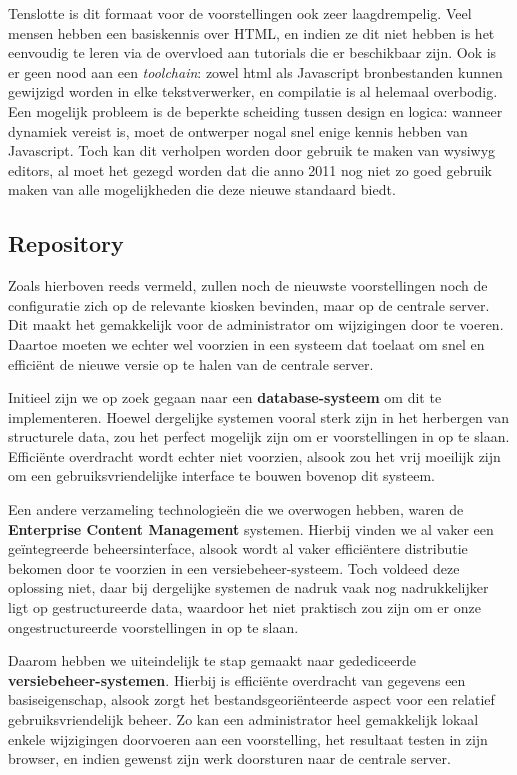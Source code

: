 Tenslotte is dit formaat voor de voorstellingen ook zeer laagdrempelig. Veel mensen hebben een basiskennis over HTML, en indien ze dit niet hebben is het eenvoudig te leren via de overvloed aan tutorials die er beschikbaar zijn. Ook is er geen nood aan een \emph{toolchain}: zowel \ac{html} als Javascript bronbestanden kunnen gewijzigd worden in elke tekstverwerker, en compilatie is al helemaal overbodig.
Een mogelijk probleem is de beperkte scheiding tussen design en logica: wanneer dynamiek vereist is, moet de ontwerper nogal snel enige kennis hebben van Javascript. Toch kan dit verholpen worden door gebruik te maken van \ac{wysiwyg} editors, al moet het gezegd worden dat die anno 2011 nog niet zo goed gebruik maken van alle mogelijkheden die deze nieuwe standaard biedt.

\subsection{Repository}

Zoals hierboven reeds vermeld, zullen noch de nieuwste voorstellingen noch de configuratie zich op de relevante kiosken bevinden, maar op de centrale server. Dit maakt het gemakkelijk voor de administrator om wijzigingen door te voeren. Daartoe moeten we echter wel voorzien in een systeem dat toelaat om snel en efficiënt de nieuwe versie op te halen van de centrale server.

Initieel zijn we op zoek gegaan naar een \textbf{database-systeem} om dit te implementeren. Hoewel dergelijke systemen vooral sterk zijn in het herbergen van structurele data, zou het perfect mogelijk zijn om er voorstellingen in op te slaan. Efficiënte overdracht wordt echter niet voorzien, alsook zou het vrij moeilijk zijn om een gebruiksvriendelijke interface te bouwen bovenop dit systeem.

Een andere verzameling technologieën die we overwogen hebben, waren de \textbf{Enterprise Content Management} systemen. Hierbij vinden we al vaker een geïntegreerde beheersinterface, alsook wordt al vaker efficiëntere distributie bekomen door te voorzien in een versiebeheer-systeem. Toch voldeed deze oplossing niet, daar bij dergelijke systemen de nadruk vaak nog nadrukkelijker ligt op gestructureerde data, waardoor het niet praktisch zou zijn om er onze ongestructureerde voorstellingen in op te slaan.

Daarom hebben we uiteindelijk te stap gemaakt naar gedediceerde \textbf{versiebeheer-systemen}. Hierbij is efficiënte overdracht van gegevens een basiseigenschap, alsook zorgt het bestandsgeoriënteerde aspect voor een relatief gebruiksvriendelijk beheer. Zo kan een administrator heel gemakkelijk lokaal enkele wijzigingen doorvoeren aan een voorstelling, het resultaat testen in zijn browser, en indien gewenst zijn werk doorsturen naar de centrale server.

